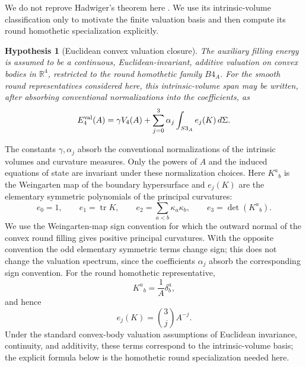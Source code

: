\documentclass[11pt,a4paper]{article}
\def\Bfour{B4}%
\def\Sthree{S3}%
\def\dd{d}%
\numberwithin{equation}{section}
\newtheorem{hypothesis}[criterion]{Hypothesis}
\theoremstyle{remark}
\newcommand{\Sthree}{S^3}
\newcommand{\Bfour}{B^4}
\newcommand{\Efour}{E_4}
\newcommand{\dd}{\mathrm{d}}
\begin{document}
We do not reprove Hadwiger's theorem here \cite{Hadwiger1957,Schneider2014}. We use its intrinsic-volume classification only to motivate the finite valuation basis and then compute its round homothetic specialization explicitly.

\begin{hypothesis}[Euclidean convex valuation closure]
The auxiliary filling energy is assumed to be a continuous, Euclidean-invariant, additive valuation on convex bodies in \(\mathbb{R}^4\), restricted to the round homothetic family \(\Bfour_A\). For the smooth round representatives considered here, this intrinsic-volume span may be written, after absorbing conventional normalizations into the coefficients, as
\begin{equation}
\Efour^{\rm val}(A)
=\gamma V_4(A)
+\sum_{j=0}^{3}\alpha_j
\int_{\Sthree_A}e_j(K)\,\dd\Sigma .
\end{equation}
\end{hypothesis}

The constants \(\gamma,\alpha_j\) absorb the conventional normalizations of the intrinsic volumes and curvature measures. Only the powers of \(A\) and the induced equations of state are invariant under these normalization choices. Here \(K^a{}_b\) is the Weingarten map of the boundary hypersurface and \(e_j(K)\) are the elementary symmetric polynomials of the principal curvatures:
\begin{equation}
e_0=1,
\qquad
e_1=\operatorname{tr}K,
\qquad
e_2=\sum_{a<b}\kappa_a\kappa_b,
\qquad
e_3=\det(K^a{}_b).
\end{equation}
We use the Weingarten-map sign convention for which the outward normal of the convex round filling gives positive principal curvatures. With the opposite convention the odd elementary symmetric terms change sign; this does not change the valuation spectrum, since the coefficients \(\alpha_j\) absorb the corresponding sign convention. For the round homothetic representative,
\begin{equation}
K^a{}_b=\frac{1}{A}\delta^a_b,
\end{equation}
and hence
\begin{equation}
e_j(K)=\binom{3}{j}A^{-j}.
\end{equation}
Under the standard convex-body valuation assumptions of Euclidean invariance, continuity, and additivity, these terms correspond to the intrinsic-volume basis; the explicit formula below is the homothetic round specialization needed here.
\end{document}
